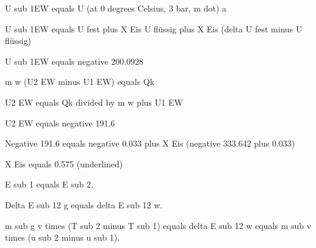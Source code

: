 U sub 1EW equals U (at 0 degrees Celsius, 3 bar, m dot) a

U sub 1EW equals U fest plus X Eis U flüssig plus X Eis (delta U fest minus U flüssig)

U sub 1EW equals negative 200.0928

m w (U2 EW minus U1 EW) equals Qk

U2 EW equals Qk divided by m w plus U1 EW

U2 EW equals negative 191.6

Negative 191.6 equals negative 0.033 plus X Eis (negative 333.642 plus 0.033)

X Eis equals 0.575 (underlined)

E sub 1 equals E sub 2.

Delta E sub 12 g equals delta E sub 12 w.

m sub g v times (T sub 2 minus T sub 1) equals delta E sub 12 w equals m sub v times (u sub 2 minus u sub 1).